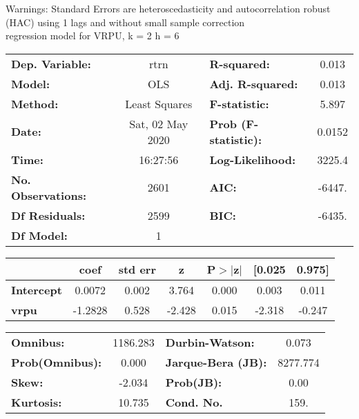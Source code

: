 Warnings: \newline
 [1] Standard Errors are heteroscedasticity and autocorrelation robust (HAC) using 1 lags and without small sample correction\\ 

regression model for VRPU, k = 2 h = 6\begin{center}
\begin{tabular}{lclc}
\toprule
\textbf{Dep. Variable:}    &       rtrn       & \textbf{  R-squared:         } &     0.013   \\
\textbf{Model:}            &       OLS        & \textbf{  Adj. R-squared:    } &     0.013   \\
\textbf{Method:}           &  Least Squares   & \textbf{  F-statistic:       } &     5.897   \\
\textbf{Date:}             & Sat, 02 May 2020 & \textbf{  Prob (F-statistic):} &   0.0152    \\
\textbf{Time:}             &     16:27:56     & \textbf{  Log-Likelihood:    } &    3225.4   \\
\textbf{No. Observations:} &        2601      & \textbf{  AIC:               } &    -6447.   \\
\textbf{Df Residuals:}     &        2599      & \textbf{  BIC:               } &    -6435.   \\
\textbf{Df Model:}         &           1      & \textbf{                     } &             \\
\bottomrule
\end{tabular}
\begin{tabular}{lcccccc}
                   & \textbf{coef} & \textbf{std err} & \textbf{z} & \textbf{P$> |$z$|$} & \textbf{[0.025} & \textbf{0.975]}  \\
\midrule
\textbf{Intercept} &       0.0072  &        0.002     &     3.764  &         0.000        &        0.003    &        0.011     \\
\textbf{vrpu}      &      -1.2828  &        0.528     &    -2.428  &         0.015        &       -2.318    &       -0.247     \\
\bottomrule
\end{tabular}
\begin{tabular}{lclc}
\textbf{Omnibus:}       & 1186.283 & \textbf{  Durbin-Watson:     } &    0.073  \\
\textbf{Prob(Omnibus):} &   0.000  & \textbf{  Jarque-Bera (JB):  } & 8277.774  \\
\textbf{Skew:}          &  -2.034  & \textbf{  Prob(JB):          } &     0.00  \\
\textbf{Kurtosis:}      &  10.735  & \textbf{  Cond. No.          } &     159.  \\
\bottomrule
\end{tabular}
\end{center}

